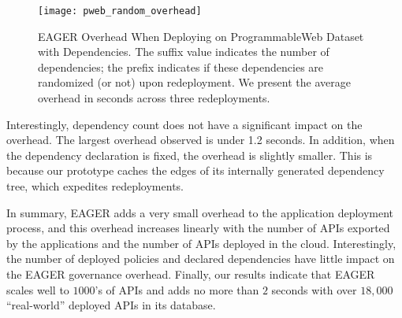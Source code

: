\begin{figure}
\centering
\texttt{[image: pweb\_random\_overhead]}
\caption{EAGER Overhead When Deploying on ProgrammableWeb Dataset with
Dependencies. The suffix value indicates the number of dependencies;
the prefix indicates if these dependencies are randomized (or not) upon
redeployment.  We present the average overhead in seconds across three redeployments.
\label{fig:pweb_random_overhead}
}
\end{figure}


Interestingly, dependency count does not have a significant impact on 
the overhead.  The largest overhead observed is under 1.2 seconds.
In addition, when the dependency declaration is fixed, the overhead is slightly smaller. 
This is because our prototype caches the edges of its internally generated dependency tree, 
which expedites redeployments.

In summary, EAGER adds a very small overhead to the application deployment
process, and 
this overhead increases linearly with the number of APIs exported by the applications
and the number of APIs deployed in the cloud. 
Interestingly, the number of deployed policies and declared dependencies
have little impact on the EAGER governance overhead. 
Finally, our results indicate that EAGER scales 
well to $1000$'s of APIs and adds no more than $2$ seconds with over
$18,000$ ``real-world'' deployed APIs in its database.
